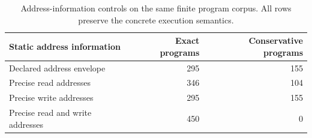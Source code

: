 \begin{table}[t]
\centering
\small
\caption{Address-information controls on the same finite program corpus. All rows preserve the concrete execution semantics.}
\label{tab:precision-controls}
\begin{tabular}{lrr}
\toprule
\textbf{Static address information} & \textbf{Exact programs} & \textbf{Conservative programs} \\
\midrule
Declared address envelope & 295 & 155 \\
Precise read addresses & 346 & 104 \\
Precise write addresses & 295 & 155 \\
Precise read and write addresses & 450 & 0 \\
\bottomrule
\end{tabular}
\end{table}
